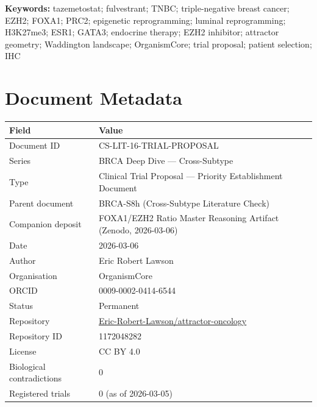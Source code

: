 \documentclass[12pt, a4paper]{article}
\begin{document}
\vspace{0.5em}
\noindent\textbf{Keywords:}
tazemetostat; fulvestrant; TNBC; triple-negative
breast cancer; EZH2; FOXA1; PRC2; epigenetic
reprogramming; luminal reprogramming; H3K27me3;
ESR1; GATA3; endocrine therapy; EZH2 inhibitor;
attractor geometry; Waddington landscape; OrganismCore;
trial proposal; patient selection; IHC

\newpage
\tableofcontents
\newpage

\section{Document Metadata}

\begin{center}
\begin{tabular}{ll}
\toprule
\textbf{Field} & \textbf{Value} \\
\midrule
Document ID       & CS-LIT-16-TRIAL-PROPOSAL \\
Series            & BRCA Deep Dive --- Cross-Subtype \\
Type              & Clinical Trial Proposal ---
                    Priority Establishment Document \\
Parent document   & BRCA-S8h (Cross-Subtype Literature
                    Check) \\
Companion deposit & FOXA1/EZH2 Ratio Master Reasoning
                    Artifact (Zenodo, 2026-03-06) \\
Date              & 2026-03-06 \\
Author            & Eric Robert Lawson \\
Organisation      & OrganismCore \\
ORCID             & 0009-0002-0414-6544 \\
Status            & Permanent \\
Repository        &
  \href{https://github.com/Eric-Robert-Lawson/attractor-oncology}
       {Eric-Robert-Lawson/attractor-oncology} \\
Repository ID     & 1172048282 \\
License           & CC BY 4.0 \\
Biological contradictions & 0 \\
Registered trials & 0 (as of 2026-03-05) \\
\bottomrule
\end{tabular}
\end{center}
\end{document}
